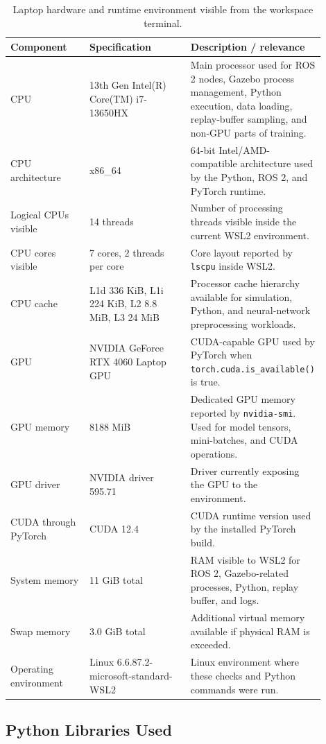 \documentclass[11pt,a4paper]{article}
\begin{document}
\begin{table}[h]
\centering
\begin{tabular}{p{0.25\linewidth} p{0.32\linewidth} p{0.33\linewidth}}
\toprule
\textbf{Component} & \textbf{Specification} & \textbf{Description / relevance} \\
\midrule
CPU & 13th Gen Intel(R) Core(TM) i7-13650HX & Main processor used for ROS 2 nodes, Gazebo process management, Python execution, data loading, replay-buffer sampling, and non-GPU parts of training. \\
CPU architecture & x86\_64 & 64-bit Intel/AMD-compatible architecture used by the Python, ROS 2, and PyTorch runtime. \\
Logical CPUs visible & 14 threads & Number of processing threads visible inside the current WSL2 environment. \\
CPU cores visible & 7 cores, 2 threads per core & Core layout reported by \texttt{lscpu} inside WSL2. \\
CPU cache & L1d 336 KiB, L1i 224 KiB, L2 8.8 MiB, L3 24 MiB & Processor cache hierarchy available for simulation, Python, and neural-network preprocessing workloads. \\
GPU & NVIDIA GeForce RTX 4060 Laptop GPU & CUDA-capable GPU used by PyTorch when \texttt{torch.cuda.is\_available()} is true. \\
GPU memory & 8188 MiB & Dedicated GPU memory reported by \texttt{nvidia-smi}. Used for model tensors, mini-batches, and CUDA operations. \\
GPU driver & NVIDIA driver 595.71 & Driver currently exposing the GPU to the environment. \\
CUDA through PyTorch & CUDA 12.4 & CUDA runtime version used by the installed PyTorch build. \\
System memory & 11 GiB total & RAM visible to WSL2 for ROS 2, Gazebo-related processes, Python, replay buffer, and logs. \\
Swap memory & 3.0 GiB total & Additional virtual memory available if physical RAM is exceeded. \\
Operating environment & Linux 6.6.87.2-microsoft-standard-WSL2 & Linux environment where these checks and Python commands were run. \\
\bottomrule
\end{tabular}
\caption{Laptop hardware and runtime environment visible from the workspace terminal.}
\end{table}

\subsection{Python Libraries Used}
\end{document}
